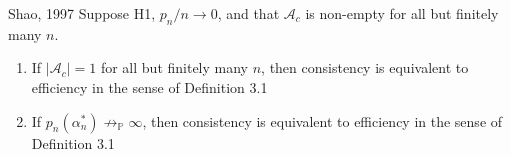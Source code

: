 \documentclass[12pt, letter paper]{article}
\newcommand{\1}{\mathmybb{1}}
\newcommand{\0}{\emptyset}
\newcommand{\prob}{\mathbb{P}}
\newcommand{\Acal}{\mathcal{A}}
\begin{document}
\begin{proposition}{{Shao, 1997}}
    Suppose H1, \(p_{n}/n\to 0\), and that \(\Acal_{c}\) is non-empty for all but finitely many \(n\).
    \begin{enumerate}
        \item If \(|\Acal_{c}|=1\) for all but finitely many \(n\), then consistency is equivalent to efficiency in the sense of Definition 3.1
        \item If \(p_{n}(\alpha^{*}_{n})\not\to_{\prob}\infty\), then consistency is equivalent to efficiency in the sense of Definition 3.1
    \end{enumerate}
\end{proposition}


  

\end{document}

